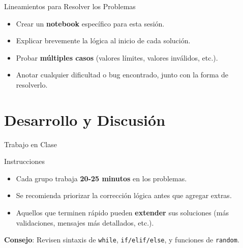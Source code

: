 \documentclass[10pt]{beamer}
\begin{document}
\begin{frame}{Lineamientos para Resolver los Problemas}
  \begin{itemize}
    \item Crear un \textbf{notebook} específico para esta sesión.
    \item Explicar brevemente la lógica al inicio de cada solución.
    \item Probar \textbf{múltiples casos} (valores límites, valores inválidos, etc.).
    \item Anotar cualquier dificultad o bug encontrado, junto con la forma de resolverlo.
  \end{itemize}
\end{frame}

\section{Desarrollo y Discusión}

\begin{frame}{Trabajo en Clase}
  \begin{block}{Instrucciones}
    \begin{itemize}
      \item Cada grupo trabaja \textbf{20-25 minutos} en los problemas.
      \item Se recomienda priorizar la corrección lógica antes que agregar extras.
      \item Aquellos que terminen rápido pueden \textbf{extender} sus soluciones (más validaciones, mensajes más detallados, etc.).
    \end{itemize}
  \end{block}
  \textbf{Consejo}: Revisen sintaxis de \texttt{while}, \texttt{if/elif/else}, y funciones de \texttt{random}.
\end{frame}
\end{document}
